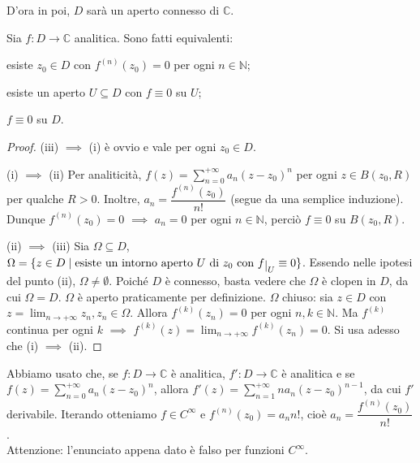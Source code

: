 D'ora in poi, $D$ sarà un aperto connesso di $\mathbb{C}$.

\begin{thm} \label{ann_anal}
  Sia $f:D \longrightarrow \mathbb{C}$ analitica. Sono fatti equivalenti:
  \begin{nlist}
    \item esiste $z_0 \in D$ con $f^{(n)}(z_0)=0$ per ogni $n \in \mathbb{N}$;
    \item esiste un aperto $U \subseteq D$ con $f \equiv 0$ su $U$;
    \item $f \equiv 0$ su $D$.
  \end{nlist}
\end{thm}

\begin{proof}
  (iii) $\implies$ (i) è ovvio e vale per ogni $z_0 \in D$.

  (i) $\implies$ (ii) Per analiticità, $\displaystyle f(z)=\sum_{n=0}^{+\infty} a_n(z-z_0)^n$ per ogni $z \in B(z_0, R)$ per qualche $R>0$. Inoltre, $a_n=\dfrac{f^{(n)}(z_0)}{n!}$ (segue da una semplice induzione). Dunque $f^{(n)}(z_0)=0$ $\implies$ $a_n=0$ per ogni $n \in \mathbb{N}$, perciò $f \equiv 0$ su $B(z_0, R)$.

  (ii) $\implies$ (iii) Sia $\Omega \subseteq D$, $\Omega=\{z \in D \mid \text{esiste un intorno aperto } U \text{ di } z_0 \text{ con } f\restrict{U}\equiv 0\}$. Essendo nelle ipotesi del punto (ii), $\Omega \not=\emptyset$. Poiché $D$ è connesso, basta vedere che $\Omega$ è clopen in $D$, da cui $\Omega=D$. $\Omega$ è aperto praticamente per definizione.
  $\Omega$ chiuso: sia $z \in D$ con $\displaystyle z=\lim_{n \longrightarrow +\infty} z_n, z_n \in \Omega$. Allora $f^{(k)}(z_n)=0$ per ogni $n, k \in \mathbb{N}$. Ma $f^{(k)}$ continua per ogni $k$ $\implies$ $\displaystyle f^{(k)}(z)=\lim_{n \longrightarrow +\infty} f^{(k)}(z_n)=0$. Si usa adesso che (i) $\implies$ (ii).
\end{proof}

Abbiamo usato che, se $f:D \longrightarrow \mathbb{C}$ è analitica, $f':D \longrightarrow \mathbb{C}$ è analitica e se $\displaystyle f(z)=\sum_{n=0}^{+\infty} a_n(z-z_0)^n$, allora $\displaystyle f'(z)=\sum_{n=1}^{+\infty} na_n(z-z_0)^{n-1}$, da cui $f'$ derivabile. Iterando otteniamo $f \in C^{\infty}$ e $f^{(n)}(z_0)=a_nn!$, cioè $a_n=\dfrac{f^{(n)}(z_0)}{n!}$. \\

Attenzione: l'enunciato appena dato è falso per funzioni $C^{\infty}$. \marginpar\warningsign

